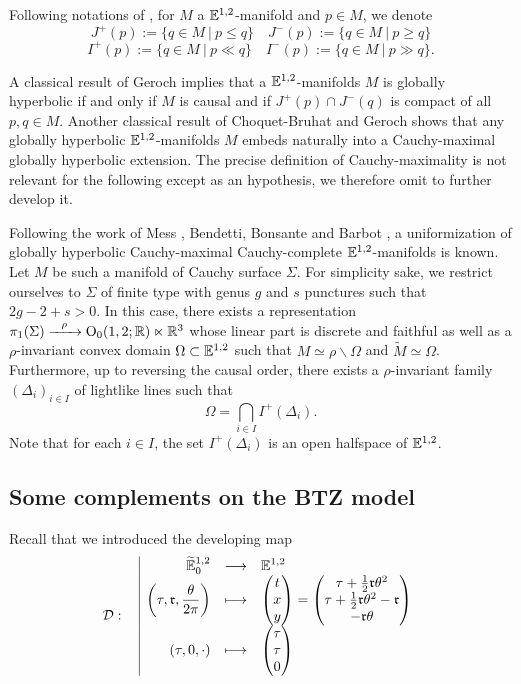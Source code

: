 Following notations of \cite{oneil}, for $M$ a $\mathbb{E}^{1,2}$-manifold and $p\in M$, we denote 
$$J^+(p) := \{q\in M~|~ p\leq q\} \quad J^-(p) := \{q\in M~|~ p\geq q\}$$
$$I^+(p) := \{q\in M~|~ p\ll q\} \quad I^-(p) := \{q\in M~|~ p\gg q\}.$$

A classical result of Geroch \cite{MR0270697,MR2196783} implies that a $\mathbb{E}^{1,2}$-manifolds $M$ is globally hyperbolic if and only if $M$ is causal and if $J^+(p)\cap J^-(q)$ is compact of all $p,q\in M$. Another classical result of Choquet-Bruhat and Geroch \cite{MR0250640,sbierski_geroch} shows that  any globally hyperbolic $\mathbb{E}^{1,2}$-manifolds $M$ embeds naturally into a Cauchy-maximal globally hyperbolic extension. 
The precise definition of Cauchy-maxi\-mality is not relevant for the following except as an hypothesis, we therefore omit to further develop it.  


Following the work of Mess \cite{mess}, Bendetti, Bonsante \cite{MR2499272,MR2170277} and Barbot \cite{barbot_globally_2004}, a uniformization of globally hyperbolic Cauchy-maximal Cauchy-complete $\mathbb{E}^{1,2}$-manifolds is known.  Let $M$ be such a manifold of Cauchy surface $\Sigma$. For simplicity sake, we restrict ourselves to $\Sigma$ of finite type with genus $g$ and $s$ punctures such that $2g-2+s>0$.   
In this case, there exists a representation  $\pi_1(\Sigma)\xrightarrow{~~\rho~~} \mathrm{O}_{0}(1,2 ; \mathbb R)\ltimes \mathbb R^3$ whose linear part is discrete and faithful as well as a $\rho$-invariant convex domain $\Omega\subset \mathbb{E}^{1,2}$ such that $M\simeq \rho\backslash \Omega$ and $\widetilde M \simeq \Omega$. Furthermore, up to reversing the causal order,  there exists a $\rho$-invariant family $(\Delta_i)_{i\in I}$ of 
lightlike lines such that $$\Omega =  \bigcap_{i\in I} I^+(\Delta_i).$$
Note that for each $i\in I$, the set $I^+(\Delta_i)$ is an open halfspace of $\mathbb{E}^{1,2}$.

\subsection{Some complements on the BTZ model}

Recall that we introduced the developing map
$$\displaystyle\mathcal{D}:\begin{array}{l|rcl} & \displaystyle {\widetilde {\mathbb{E}}}^{1,2}_0 & \longrightarrow & \displaystyle \mathbb{E}^{1,2} \\ & \displaystyle \left(\tau,\mathfrak{r},\frac{\theta}{2\pi}\right) & \longmapsto & \displaystyle 
\begin{pmatrix}t \\ x \\ y\end{pmatrix}=\begin{pmatrix} \tau + \frac{1}{2}\mathfrak{r}\theta^2 \\ \tau + \frac{1}{2}\mathfrak{r}\theta^2 -\mathfrak{r} \\ -\mathfrak{r}\theta  \end{pmatrix}
 \\ & \displaystyle (\tau,0,\cdot) & \longmapsto & \displaystyle \begin{pmatrix}\tau \\ \tau \\ 0\end{pmatrix}\end{array}$$

